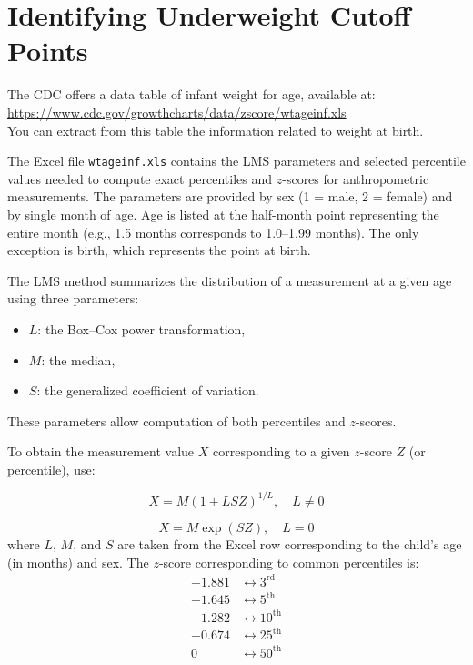 \section{Identifying Underweight Cutoff Points}
The CDC offers a data table of infant weight for age, available at: \\ \href{https://www.cdc.gov/growthcharts/data/zscore/wtageinf.xls}{https://www.cdc.gov/growthcharts/data/zscore/wtageinf.xls} \\ You can extract from this table the information related to weight at birth.

The Excel file \texttt{wtageinf.xls} contains the LMS parameters and selected percentile values needed to compute exact percentiles and $z$-scores for anthropometric measurements. The parameters are provided by sex (1 = male, 2 = female) and by single month of age. Age is listed at the half-month point representing the entire month (e.g., 1.5 months corresponds to 1.0--1.99 months). The only exception is birth, which represents the point at birth.

The LMS method summarizes the distribution of a measurement at a given age using three parameters:
\begin{itemize}
    \item $L$: the Box--Cox power transformation,
    \item $M$: the median,
    \item $S$: the generalized coefficient of variation.
\end{itemize}
These parameters allow computation of both percentiles and $z$-scores.

To obtain the measurement value $X$ corresponding to a given $z$-score $Z$ (or percentile), use:

\[
X = M(1 + LSZ)^{1/L}, \quad L \neq 0
\]

\[
X = M \exp(SZ), \quad L = 0
\]
%
where $L$, $M$, and $S$ are taken from the Excel row corresponding to the child's age (in months) and sex. The $z$-score corresponding to common percentiles is:
%
\[
\begin{aligned}
-1.881 &\leftrightarrow 3^\text{rd} \\
-1.645 &\leftrightarrow 5^\text{th} \\
-1.282 &\leftrightarrow 10^\text{th} \\
-0.674 &\leftrightarrow 25^\text{th} \\
0      &\leftrightarrow 50^\text{th}
\end{aligned}
\]
%
